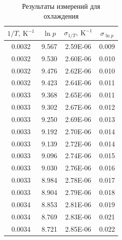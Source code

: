 \documentclass[a4paper,12pt]{report}
\begin{document}
\begin{multicols}{2}
    \begin{table}[H]
        \centering
        \begin{tabular}{|c|c|c|c|}
            \hline
            $1/T, \ \text{K}^{-1}$ & $\ln p$ & $\sigma_{1/T}, \ \text{K}^{-1}$ & $\sigma_{\ln p}$ \\
            \hline
            0.0032 & 9.567 & 2.59E-06 & 0.009 \\
            \hline
            0.0032 & 9.530 & 2.60E-06 & 0.010 \\
            \hline
            0.0032 & 9.476 & 2.62E-06 & 0.010 \\
            \hline
            0.0032 & 9.423 & 2.64E-06 & 0.011 \\
            \hline
            0.0033 & 9.368 & 2.65E-06 & 0.011 \\
            \hline
            0.0033 & 9.302 & 2.67E-06 & 0.012 \\
            \hline
            0.0033 & 9.250 & 2.69E-06 & 0.013 \\
            \hline
            0.0033 & 9.192 & 2.70E-06 & 0.014 \\
            \hline
            0.0033 & 9.139 & 2.72E-06 & 0.014 \\
            \hline
            0.0033 & 9.096 & 2.74E-06 & 0.015 \\
            \hline
            0.0033 & 9.030 & 2.76E-06 & 0.016 \\
            \hline
            0.0033 & 8.984 & 2.78E-06 & 0.017 \\
            \hline
            0.0033 & 8.904 & 2.79E-06 & 0.018 \\
            \hline
            0.0034 & 8.853 & 2.81E-06 & 0.019 \\
            \hline
            0.0034 & 8.769 & 2.83E-06 & 0.021 \\
            \hline
            0.0034 & 8.721 & 2.85E-06 & 0.022 \\
            \hline
        \end{tabular}
        \caption{Результаты измерений для охлаждения}
    \end{table}
\end{multicols}
\end{document}
